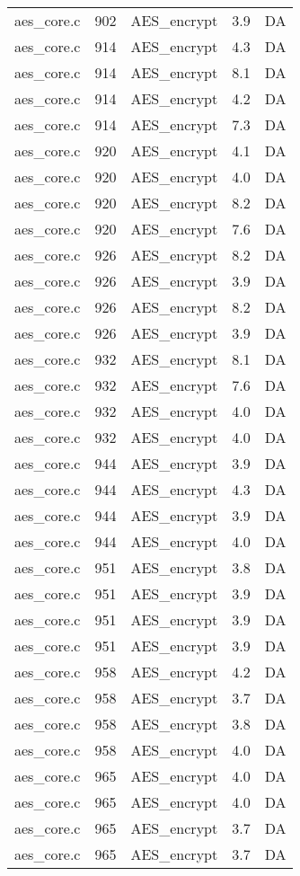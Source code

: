 \begin{table}[!ht]
\begin{tabular}{lrlrr}
aes\_core.c& 902&AES\_encrypt&3.9 &DA\\
aes\_core.c& 914&AES\_encrypt&4.3 &DA\\
aes\_core.c& 914&AES\_encrypt&8.1 &DA\\
aes\_core.c& 914&AES\_encrypt&4.2 &DA\\
aes\_core.c& 914&AES\_encrypt&7.3 &DA\\
aes\_core.c& 920&AES\_encrypt&4.1 &DA\\
aes\_core.c& 920&AES\_encrypt&4.0 &DA\\
aes\_core.c& 920&AES\_encrypt&8.2 &DA\\
aes\_core.c& 920&AES\_encrypt&7.6 &DA\\
aes\_core.c& 926&AES\_encrypt&8.2 &DA\\
aes\_core.c& 926&AES\_encrypt&3.9 &DA\\
aes\_core.c& 926&AES\_encrypt&8.2 &DA\\
aes\_core.c& 926&AES\_encrypt&3.9 &DA\\
aes\_core.c& 932&AES\_encrypt&8.1 &DA\\
aes\_core.c& 932&AES\_encrypt&7.6 &DA\\
aes\_core.c& 932&AES\_encrypt&4.0 &DA\\
aes\_core.c& 932&AES\_encrypt&4.0 &DA\\
aes\_core.c& 944&AES\_encrypt&3.9 &DA\\
aes\_core.c& 944&AES\_encrypt&4.3 &DA\\
aes\_core.c& 944&AES\_encrypt&3.9 &DA\\
aes\_core.c& 944&AES\_encrypt&4.0 &DA\\
aes\_core.c& 951&AES\_encrypt&3.8 &DA\\
aes\_core.c& 951&AES\_encrypt&3.9 &DA\\
aes\_core.c& 951&AES\_encrypt&3.9 &DA\\
aes\_core.c& 951&AES\_encrypt&3.9 &DA\\
aes\_core.c& 958&AES\_encrypt&4.2 &DA\\
aes\_core.c& 958&AES\_encrypt&3.7 &DA\\
aes\_core.c& 958&AES\_encrypt&3.8 &DA\\
aes\_core.c& 958&AES\_encrypt&4.0 &DA\\
aes\_core.c& 965&AES\_encrypt&4.0 &DA\\
aes\_core.c& 965&AES\_encrypt&4.0 &DA\\
aes\_core.c& 965&AES\_encrypt&3.7 &DA\\
aes\_core.c& 965&AES\_encrypt&3.7 &DA\\
\hline
\end{tabular}
\renewcommand{\baselinestretch}{1.0}\selectfont
\end{table}
